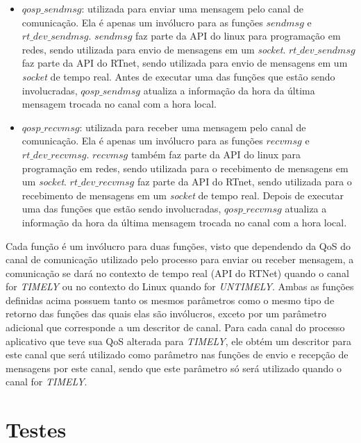 \begin{itemize}
\item $qosp\_sendmsg$: utilizada para enviar uma mensagem pelo canal de comunicação. Ela é apenas um invólucro para as funções $sendmsg$ e $rt\_dev\_sendmsg$. $sendmsg$ faz parte da API do linux para programação em redes, sendo utilizada para envio de mensagens em um \textit{socket}. $rt\_dev\_sendmsg$ faz parte da API do RTnet, sendo utilizada para envio de mensagens em um \textit{socket} de tempo real. Antes de executar uma das funções que estão sendo involucradas, $qosp\_sendmsg$ atualiza a informação da hora da última mensagem trocada no canal com a hora local.

\item $qosp\_recvmsg$: utilizada para receber uma mensagem pelo canal de comunicação. Ela é apenas um invólucro para as funções $recvmsg$ e $rt\_dev\_recvmsg$. $recvmsg$ também faz parte da API do linux para programação em redes, sendo utilizada para o recebimento de mensagens em um \textit{socket}. $rt\_dev\_recvmsg$ faz parte da API do RTnet, sendo utilizada para o recebimento de mensagens em um \textit{socket} de tempo real. Depois de executar uma das funções que estão sendo involucradas, $qosp\_recvmsg$ atualiza a informação da hora da última mensagem trocada no canal com a hora local.
\end{itemize}

	Cada função é um invólucro para duas funções, visto que dependendo da QoS do canal de comunicação utilizado pelo processo para enviar ou receber mensagem, a comunicação se dará no contexto de tempo real (API do RTNet) quando o canal for \textit{TIMELY} ou no contexto do Linux quando for \textit{UNTIMELY}. Ambas as funções definidas acima possuem tanto os mesmos parâmetros como o mesmo tipo de retorno das funções das quais elas são invólucros, exceto por um parâmetro adicional que corresponde a um descritor de canal. Para cada canal do processo aplicativo que teve sua QoS alterada para \textit{TIMELY}, ele obtém um descritor para este canal que será utilizado como parâmetro nas funções de envio e recepção de mensagens por este canal, sendo que este parâmetro só será utilizado quando o canal for \textit{TIMELY}.
	
\section{Testes}	

